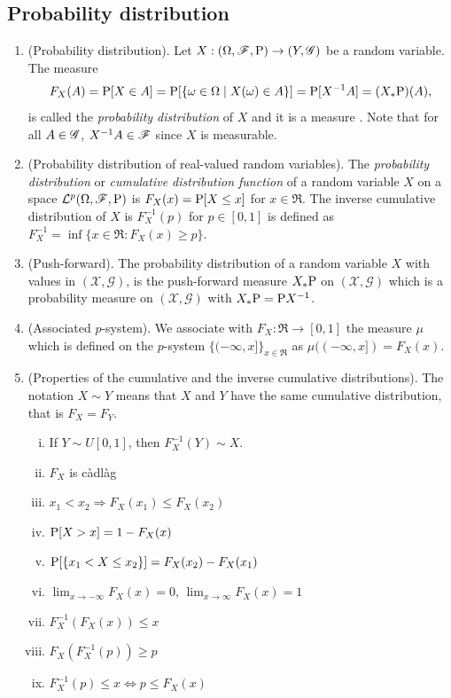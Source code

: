 \documentclass[a4paper,10pt]{scrbook}
\begin{document}
\subsection{Probability distribution}
\begin{enumerate} 
 
 \item (Probability distribution). Let $X:(\Omega,\mathscr{F},\mathrm{P}) \to (Y, \mathscr{G})$ be a random variable. The measure
 \[
  F_X(A) = \mathrm{P}[X\in A] = \mathrm{P}[\{\omega\in\Omega\mid X(\omega) \in A\}] = \mathrm{P}[X^{-1}A] = (X_*\mathrm{P})(A),
 \]
 is called the \textit{probability distribution} of $X$ and it is a measure . Note that for all $A\in\mathscr{G}$, $X^{-1}A\in\mathscr{F}$
 since $X$ is measurable. 
 \item \label{rv221088}
 (Probability distribution of real-valued random variables).
 The \textit{probability distribution} or \textit{cumulative distribution function} of a random variable $X$ on a space
 $\mathcal{L}^p(\Omega,\mathscr{F},\mathrm{P})$ is $F_X(x) = \mathrm{P}[X\leq x]$ for $x\in\Re$. The inverse cumulative
 distribution of $X$ is $F_X^{-1}(p)$ for $p\in[0,1]$ is defined as 
 $F_X^{-1}=\inf\{x\in\Re: F_X(x) \geq p\}$. 
 
 \item (Push-forward).
 \label{rv221089}
 The probability distribution of a random variable $X$ with values in $(\mathcal{X},\mathscr{G})$,
 is the push-forward measure $X_*\mathrm{P}$ on $(\mathcal{X},\mathscr{G})$ which is 
 a probability measure on $(\mathcal{X},\mathscr{G})$ with $X_*\mathrm{P} = \mathrm{P} X^{-1}$.
 
 
 \item 
 \label{rv221137}
 (Associated $p$-system). We associate with $F_X:\Re\to[0,1]$ the measure $\mu$ which is defined on 
 the $p$-system $\{(-\infty,x]\}_{x\in\Re}$ as $\mu((-\infty, x]) = F_X(x)$.
 
 \item
 \label{rv231132}
 (Properties of the cumulative and the inverse cumulative distributions). The notation
 $X\sim Y$ means that $X$ and $Y$ have the same cumulative distribution, that is 
 $F_X = F_Y$.
    \begin{enumerate}[i.]
      \item If $Y\sim U[0,1]$, then $F_X^{-1}(Y) \sim X$.
      \item $F_X$ is c\`adl\`ag
      \item $x_1<x_2 \Rightarrow F_X(x_1) \leq F_X(x_2)$
      \item $\mathrm{P}[X>x] = 1 - F_X(x)$
      \item $\mathrm{P}[\{x_1 < X \leq x_2\}] = F_X(x_2) - F_X(x_1)$
      \item $\lim_{x\to-\infty}F_X(x) = 0$, $\lim_{x\to\infty}F_X(x) = 1$
      \item $F_X^{-1}(F_X(x)) \leq x$
      \item $F_X(F_X^{-1}(p)) \geq p$
      \item $F_X^{-1}(p) \leq x \Leftrightarrow p \leq F_X(x)$
    \end{enumerate}
\end{enumerate}
\end{document}
